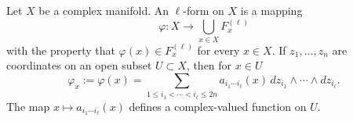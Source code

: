 Let $X$ be a complex manifold. An $\ell$-form on $X$ is a mapping
$$\varphi: X \rightarrow \bigcup_{x \in X} F_x^{(\ell)}$$
with the property that $\varphi(x) \in F_x^{(\ell)}$ for every $x \in X$. If $z_1, \ldots, z_n$ are coordinates on an open subset $U \subset X$, then for $x \in U$
$$\varphi_x := \varphi(x) = \sum_{1 \leqslant i_1 < \cdots < i_\ell \leqslant 2n} a_{i_1 \cdots i_\ell}(x) \, dz_{i_1} \wedge \cdots \wedge dz_{i_\ell}.$$
The map $x \mapsto a_{i_1 \cdots i_\ell}(x)$ defines a complex-valued function on $U$.

